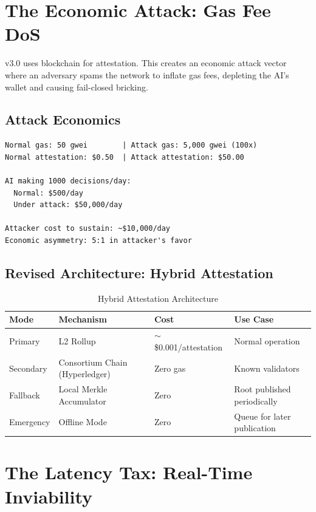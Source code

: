 \documentclass[11pt,letterpaper]{article}
\theoremstyle{definition}
\theoremstyle{remark}
\begin{document}
\section{The Economic Attack: Gas Fee DoS}

v3.0 uses blockchain for attestation. This creates an economic attack vector where an adversary spams the network to inflate gas fees, depleting the AI's wallet and causing fail-closed bricking.

\subsection{Attack Economics}

\begin{verbatim}
Normal gas: 50 gwei        | Attack gas: 5,000 gwei (100x)
Normal attestation: $0.50  | Attack attestation: $50.00

AI making 1000 decisions/day:
  Normal: $500/day
  Under attack: $50,000/day

Attacker cost to sustain: ~$10,000/day
Economic asymmetry: 5:1 in attacker's favor
\end{verbatim}

\subsection{Revised Architecture: Hybrid Attestation}

\begin{table}[h]
\centering
\begin{tabular}{@{}llll@{}}
\toprule
\textbf{Mode} & \textbf{Mechanism} & \textbf{Cost} & \textbf{Use Case} \\
\midrule
Primary & L2 Rollup & $\sim$\$0.001/attestation & Normal operation \\
Secondary & Consortium Chain (Hyperledger) & Zero gas & Known validators \\
Fallback & Local Merkle Accumulator & Zero & Root published periodically \\
Emergency & Offline Mode & Zero & Queue for later publication \\
\bottomrule
\end{tabular}
\caption{Hybrid Attestation Architecture}
\end{table}


\section{The Latency Tax: Real-Time Inviability}
\end{document}
